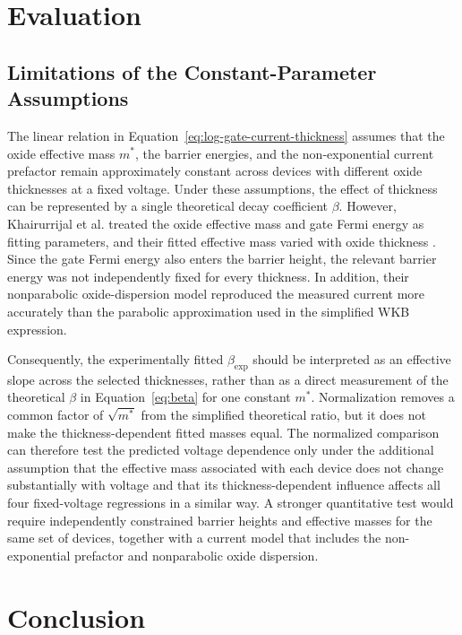 \documentclass[12pt]{article}
\begin{document}
\section{Evaluation}

\subsection{Limitations of the Constant-Parameter Assumptions}

The linear relation in Equation~\eqref{eq:log-gate-current-thickness} assumes that the oxide effective mass \(m^*\), the barrier energies, and the non-exponential current prefactor remain approximately constant across devices with different oxide thicknesses at a fixed voltage. Under these assumptions, the effect of thickness can be represented by a single theoretical decay coefficient \(\beta\). However, Khairurrijal et al. treated the oxide effective mass and gate Fermi energy as fitting parameters, and their fitted effective mass varied with oxide thickness \cite{khairurrijal2000}. Since the gate Fermi energy also enters the barrier height, the relevant barrier energy was not independently fixed for every thickness. In addition, their nonparabolic oxide-dispersion model reproduced the measured current more accurately than the parabolic approximation used in the simplified WKB expression.

Consequently, the experimentally fitted \(\beta_{\mathrm{exp}}\) should be interpreted as an effective slope across the selected thicknesses, rather than as a direct measurement of the theoretical \(\beta\) in Equation~\eqref{eq:beta} for one constant \(m^*\). Normalization removes a common factor of \(\sqrt{m^*}\) from the simplified theoretical ratio, but it does not make the thickness-dependent fitted masses equal. The normalized comparison can therefore test the predicted voltage dependence only under the additional assumption that the effective mass associated with each device does not change substantially with voltage and that its thickness-dependent influence affects all four fixed-voltage regressions in a similar way. A stronger quantitative test would require independently constrained barrier heights and effective masses for the same set of devices, together with a current model that includes the non-exponential prefactor and nonparabolic oxide dispersion.

\section{Conclusion}
\end{document}
